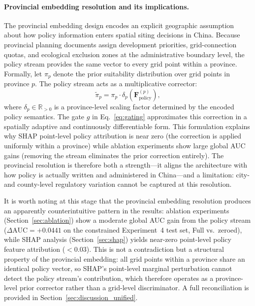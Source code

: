 \documentclass[12pt, a4paper]{article}
\begin{document}
\paragraph{Provincial embedding resolution and its
implications.}
The provincial embedding design encodes an explicit
geographic assumption about how policy information enters
spatial siting decisions in China. Because provincial
planning documents assign development priorities,
grid-connection quotas, and ecological exclusion zones at
the administrative boundary level, the policy stream
provides the same vector to every grid point within a
province. Formally, let $\pi_p$ denote the prior
suitability distribution over grid points in province $p$.
The policy stream acts as a multiplicative corrector:
\begin{equation}
\tilde{\pi}_p = \pi_p \cdot \delta_p(\mathbf{F}_\text{policy}^{(p)}),
\label{eq:pspr}
\end{equation}
where $\delta_p \in \mathbb{R}_{>0}$ is a province-level
scaling factor determined by the encoded policy semantics.
The gate $g$ in Eq.~\eqref{eq:gating} approximates this
correction in a spatially adaptive and continuously
differentiable form. This formulation explains why SHAP
point-level policy attribution is near zero (the correction
is applied uniformly within a province) while ablation
experiments show large global AUC gains (removing the
stream eliminates the prior correction entirely). The
provincial resolution is therefore both a strength---it
aligns the architecture with how policy is actually written
and administered in China---and a limitation: city- and
county-level regulatory variation cannot be captured at this
resolution.

It is worth noting at this stage that the provincial
embedding resolution produces an apparently counterintuitive
pattern in the results: ablation experiments
(Section~\ref{sec:ablation}) show a moderate global AUC gain
from the policy stream ($\Delta\text{AUC}=+0.0441$ on the
constrained Experiment~4 test set, Full vs.\ zeroed), while
SHAP analysis (Section~\ref{sec:shap}) yields near-zero
point-level policy feature attribution ($< 0.03$). This is
not a contradiction but a structural property of the
provincial embedding: all grid points within a province
share an identical policy vector, so SHAP's point-level
marginal perturbation cannot detect the policy stream's
contribution, which therefore operates as a
province-level prior corrector rather than a grid-level
discriminator. A full reconciliation is provided in
Section~\ref{sec:discussion_unified}.
\end{document}

